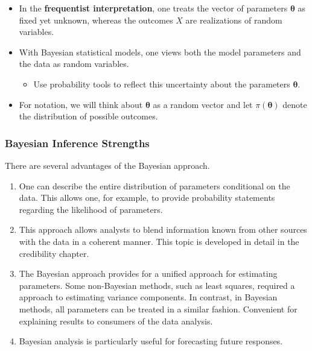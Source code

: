 \documentclass[]{book}
\providecommand{\tightlist}{%
  \setlength{\itemsep}{0pt}\setlength{\parskip}{0pt}}
\begin{document}
\begin{itemize}
\item
  In the \textbf{frequentist interpretation}, one treats the vector of
  parameters \(\boldsymbol \theta\) as fixed yet unknown, whereas the
  outcomes \(X\) are realizations of random variables.
\item
  With Bayesian statistical models, one views both the model parameters
  and the data as random variables.

  \begin{itemize}
  \tightlist
  \item
    Use probability tools to reflect this uncertainty about the
    parameters \(\boldsymbol \theta\).
  \end{itemize}
\item
  For notation, we will think about \(\boldsymbol \theta\) as a random
  vector and let \(\pi(\boldsymbol \theta)\) denote the distribution of
  possible outcomes.
\end{itemize}

\subsubsection{Bayesian Inference
Strengths}\label{bayesian-inference-strengths}

There are several advantages of the Bayesian approach.

\begin{enumerate}
\def\labelenumi{\arabic{enumi}.}
\item
  One can describe the entire distribution of parameters conditional on
  the data. This allows one, for example, to provide probability
  statements regarding the likelihood of parameters.
\item
  This approach allows analysts to blend information known from other
  sources with the data in a coherent manner. This topic is developed in
  detail in the credibility chapter.
\item
  The Bayesian approach provides for a unified approach for estimating
  parameters. Some non-Bayesian methods, such as least squares, required
  a approach to estimating variance components. In contrast, in Bayesian
  methods, all parameters can be treated in a similar fashion.
  Convenient for explaining results to consumers of the data analysis.
\item
  Bayesian analysis is particularly useful for forecasting future
  responses.
\end{enumerate}
\end{document}
